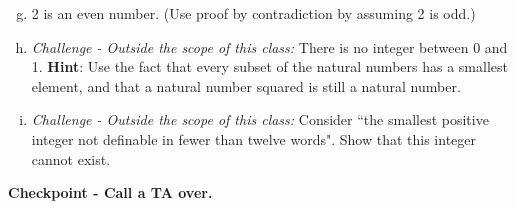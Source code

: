 \documentclass[12pt,letterpaper]{article}
\newcommand\hint[1]{\textbf{Hint}: #1}
\newif\ifsol
\begin{document}
      \begin{enumerate}[a.]
         \setcounter{enumi}{6}

        \item 2 is an even number. (Use proof by contradiction by assuming 2 is odd.)

        \begin{mdframed}
		\ifsol
			Assume for sake of contradiction that 2 was odd. Then $2 = 2k+1$ for some integer $k$. Then $k = \frac{1}{2}$ which is a contradiction since $k$ is an integer.
		\else
        \vspace{4cm}
		\fi
        \end{mdframed}

        \item \textit{Challenge - Outside the scope of this class:} There is no integer between 0 and 1.
        \hint{Use the fact that every subset of the natural numbers has a smallest element, and that a natural number squared is still a natural number.}

        \begin{mdframed}
		\ifsol
			Consider the set $S$ which is the set of integers between 0 and 1. Assume for sake of contradiction that this set were non-empty. Then $S$ has a smallest element, which we can call $n$. However, $n^2$ is still between 0 and 1 and is still an integer (since the integers are closed under multiplication). Moreover, $n^2$ is smaller than $n$ which is a contradiction as we assumed that $n$ was the smallest integer between 0 and 1. 
		\else
        \vspace{4cm}
		\fi
        \end{mdframed}

        \item \textit{Challenge - Outside the scope of this class:} Consider ``the smallest positive integer not definable in fewer than twelve words". Show that this integer cannot exist.

        \begin{mdframed}
		\ifsol
			Say there was some smallest positive integer not definable in fewer than twelve words. Call this integer $s$. We could then define $s$ in fewer than twelve words by saying ``the smallest positive integer not definable in fewer than twelve words." This is a contradiction.
		\else
        \vspace{4cm}
		\fi
        \end{mdframed}
      \end{enumerate}
  
		\textbf{Checkpoint - Call a TA over.}
\end{document}
